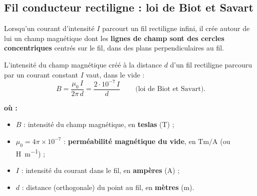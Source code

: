 \documentclass[11pt,a4paper]{article}
\newenvironment{ou}{%
  \par\smallskip\noindent\textbf{où :}\nopagebreak
  \begin{itemize}[leftmargin=1.8em,topsep=2pt,itemsep=1.5pt,parsep=0pt]}%
  {\end{itemize}}
\newcommand{\Bvec}{\vec{B}}
\begin{document}
\subsection{Fil conducteur rectiligne : loi de Biot et Savart}

Lorsqu'un courant d'intensité $I$ parcourt un fil rectiligne infini, il crée autour de lui un champ
magnétique dont les \textbf{lignes de champ sont des cercles concentriques} centrés sur le fil, dans
des plans perpendiculaires au fil.

\begin{center}
\end{center}

\begin{formule}
L'intensité du champ magnétique créé à la distance $d$ d'un fil rectiligne parcouru par un courant
constant $I$ vaut, dans le vide :
\[ \boxed{\,B = \dfrac{\mu_0\, I}{2\pi\, d} = \dfrac{2\cdot 10^{-7}\, I}{d}\,} \qquad\text{(loi de Biot et Savart).} \]
\begin{ou}
  \item $B$ : intensité du champ magnétique, en \textbf{teslas} (\si{\tesla}) ;
  \item $\mu_0 = 4\pi\times 10^{-7}$ : \textbf{perméabilité magnétique du vide}, en
        $\si{\tesla\metre\per\ampere}$ (ou \si{\henry\per\metre}) ;
  \item $I$ : intensité du courant dans le fil, en \textbf{ampères} (\si{\ampere}) ;
  \item $d$ : distance (orthogonale) du point au fil, en \textbf{mètres} (\si{\metre}).
\end{ou}
\end{formule}
\end{document}
